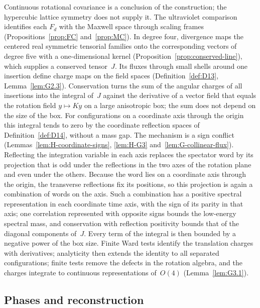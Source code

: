 Continuous rotational covariance is a conclusion of the construction; the hypercubic lattice symmetry does not supply it. The ultraviolet comparison identifies each $F_d$ with the Maxwell space through scaling frames (Propositions~\ref{prop:FC} and~\ref{prop:MC}). In degree four, divergence maps the centered real symmetric tensorial families onto the corresponding vectors of degree five with a one-dimensional kernel (Proposition~\ref{prop:conserved-line}), which supplies a conserved tensor~$J$. Its fluxes through small shells around one insertion define charge maps on the field spaces (Definition~\ref{def:D13}, Lemma~\ref{lem:G2.3}). Conservation turns the sum of the angular charges of all insertions into the integral of~$J$ against the derivative of a vector field that equals the rotation field $y\mapsto Ky$ on a large anisotropic box; the sum does not depend on the size of the box. For configurations on a coordinate axis through the origin this integral tends to zero by the coordinate reflection spaces of Definition~\ref{def:D14}, without a mass gap. The mechanism is a sign conflict (Lemmas~\ref{lem:H-coordinate-signs}, \ref{lem:H-G3} and~\ref{lem:G-collinear-flux}). Reflecting the integration variable in each axis replaces the spectator word by its projection that is odd under the reflections in the two axes of the rotation plane and even under the others. Because the word lies on a coordinate axis through the origin, the transverse reflections fix its positions, so this projection is again a combination of words on the axis. Such a combination has a positive spectral representation in each coordinate time axis, with the sign of its parity in that axis; one correlation represented with opposite signs bounds the low-energy spectral mass, and conservation with reflection positivity bounds that of the diagonal components of~$J$. Every term of the integral is then bounded by a negative power of the box size. Finite Ward tests identify the translation charges with derivatives; analyticity then extends the identity to all separated configurations; finite tests remove the defects in the rotation algebra, and the charges integrate to continuous representations of~$O(4)$ (Lemma~\ref{lem:G3.1}).

\subsection{Phases and reconstruction}\label{sec:strategy-reconstruction}

